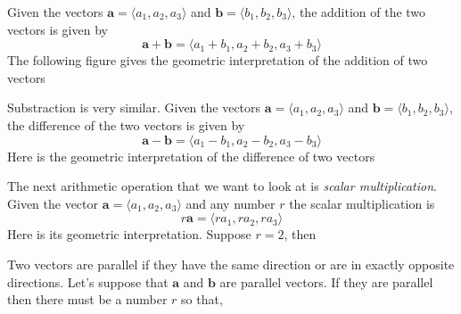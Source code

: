 \documentclass[10pt,reqno]{book}
\theoremstyle{definition}
\renewcommand{\vec}[1]{\mathbf{#1}}
\begin{document}
	Given the vectors $\vec{a} = \langle a_1,a_2,a_3 \rangle$ and $\vec{b} = \langle b_1,b_2,b_3 \rangle$, the addition of  the two vectors is given by
	\[ \vec{a} + \vec{b} = \langle a_1+b_1,a_2+b_2,a_3+b_3 \rangle \]
	The following figure gives the geometric interpretation of the addition of two vectors
	\begin{center}
	\end{center}
	Substraction is very similar. Given the vectors $\vec{a} = \langle a_1,a_2,a_3 \rangle$ and $\vec{b} = \langle b_1,b_2,b_3 \rangle$, the difference of the two vectors is given by
	\[ \vec{a} - \vec{b} = \langle a_1-b_1,a_2-b_2,a_3-b_3 \rangle \]
	Here is the geometric interpretation of the difference of two vectors
	\begin{center}
	\end{center}
	The next arithmetic operation that we want to look at is \textit{scalar multiplication}. Given the vector $\vec{a} = \langle a_1,a_2,a_3 \rangle$ and any number $r$ the scalar multiplication is 
	\[ r\vec{a} = \langle ra_1,ra_2,ra_3 \rangle \]
	Here is its geometric interpretation. Suppose $r=2$, then
	\begin{center}
	\end{center}
	Two vectors are parallel if they have the same direction or are in exactly opposite directions. Let's suppose that $\vec{a}$ and $\vec{b}$ are parallel vectors. If they are parallel then there must be a number $r$ so that, 
\end{document}
